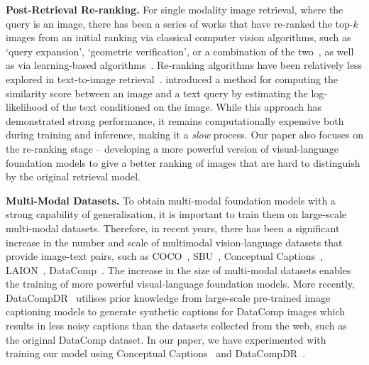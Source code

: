 \vspace{2pt}
\noindent \textbf{Post-Retrieval Re-ranking.}
For single modality image retrieval, where the query is an image, there has been a series of works that have re-ranked the top-$k$ images from an initial ranking via classical computer vision algorithms, such as `query expansion', `geometric verification', or a combination of the two~\cite{jegou2008hamming,philbin2007object,chum2011total,chum2007total,tolias2014visual,Arandjelovic12}, as well as via learning-based algorithms~\cite{cao2020unifying,hausler2021patch,el2021training,tan2021instance,Bhalgat23}. 
Re-ranking algorithms have been relatively less explored in text-to-image retrieval~\cite{yanagi2019text,qu2023learnable,long2024cfir}. \cite{miech2021thinking} introduced a method for computing the similarity score between an image and a text query by estimating the log-likelihood of the text conditioned on the image. While this approach has demonstrated strong performance, it remains computationally expensive both during training and inference, making it a {\em slow} process.
Our paper also focuses on the re-ranking stage -- developing a more powerful version of visual-language foundation models to give a better ranking of images that are  hard to distinguish by the original retrieval model.




\vspace{2pt}
\noindent \textbf{Multi-Modal Datasets.} 
To obtain multi-modal foundation models with a strong capability of generalisation, it is important to train them on large-scale multi-modal datasets.
Therefore, in recent years, there has been a significant increase in the number and scale of multimodal vision-language datasets that provide image-text pairs, such as
COCO~\cite{lin2014microsoft}, SBU~\cite{ordonez2011im2text}, Conceptual Captions~\cite{sharma2018conceptual}, LAION~\cite{schuhmann2022laion}, DataComp~\cite{gadre2024datacomp}. The increase in the size of multi-modal datasets enables the training of more powerful visual-language foundation models. More recently, DataCompDR~\cite{vasu2024mobileclip} utilises prior knowledge from large-scale pre-trained image captioning models to generate synthetic captions for DataComp images which results in less noisy captions than the datasets collected from the web, such as the original DataComp dataset. In our paper, we have experimented with training our model using Conceptual Captions~\cite{sharma2018conceptual} and DataCompDR~\cite{vasu2024mobileclip}.


